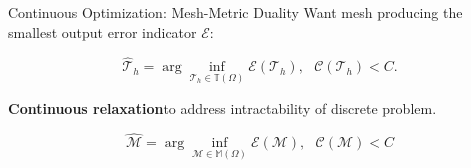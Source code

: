 \documentclass{beamer}
\newcounter{sectionframes}
\newcommand{\setsectionframes}[1]{%
  \setcounter{sectionframes}{#1}%
}
\newcounter{sectionframecount}
\begin{document}
\setsectionframes{3}



\begin{frame}[t]{Continuous Optimization: Mesh-Metric Duality}
\vspace{-10pt}
Want mesh producing the smallest output error indicator $\mathcal{E}$:

\begin{equation}
  \hat{\mathcal{T}}_h = \arg \inf_{\mathcal{T}_h \in \mathbb{T}(\Omega)} \mathcal{E}(\mathcal{T}_h),~~~\mathcal{C}(\mathcal{T}_h) < C.
\end{equation}

\textbf{Continuous relaxation}\footnotemark to address intractability of discrete problem.

\begin{equation}
  \hat{\mathcal{M}} = \arg\inf_{\mathcal{M} \in \mathbb{M}(\Omega)} \mathcal{E}(\mathcal{M}),~~~\mathcal{C}(\mathcal{M}) < C
\end{equation}



\end{frame}

\end{document}
